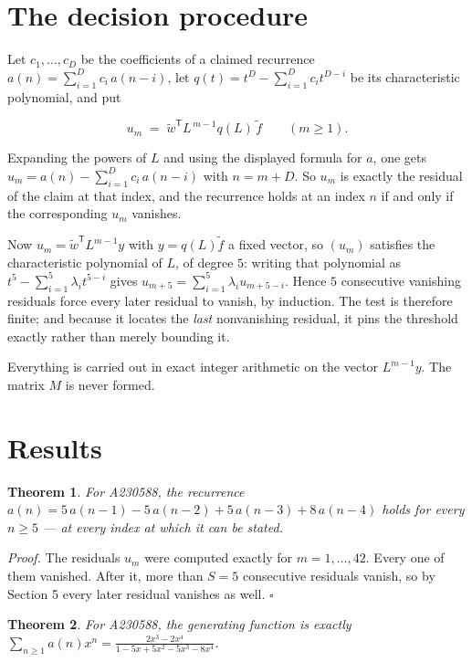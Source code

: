 \documentclass[11pt]{article}
\newtheorem{theorem}{Theorem}
\theoremstyle{definition}
\begin{document}
\section{The decision procedure}

Let $c_1,\dots,c_D$ be the coefficients of a claimed recurrence $a(n) = \sum_{i=1}^{D} c_i\,a(n-i)$, let $q(t) = t^{D} - \sum_{i=1}^{D} c_i t^{D-i}$ be its characteristic polynomial, and put

\[u_m \;=\; \tilde w^{\mathsf T} L^{\,m-1} q(L)\,\tilde f \qquad (m \ge 1).\]

Expanding the powers of $L$ and using the displayed formula for $a$, one gets $u_m = a(n) - \sum_{i=1}^{D} c_i\,a(n-i)$ with $n = m + D$. So $u_m$ is exactly the residual of the claim at that index, and the recurrence holds at an index $n$ if and only if the corresponding $u_m$ vanishes.

Now $u_m = \tilde w^{\mathsf T} L^{m-1} y$ with $y = q(L)\tilde f$ a fixed vector, so $(u_m)$ satisfies the characteristic polynomial of $L$, of degree $5$: writing that polynomial as $t^{5} - \sum_{i=1}^{5} \lambda_i t^{5-i}$ gives $u_{m+5} = \sum_{i=1}^{5} \lambda_i u_{m+5-i}$. Hence $5$ consecutive vanishing residuals force every later residual to vanish, by induction. The test is therefore finite; and because it locates the {\itshape last} nonvanishing residual, it pins the threshold exactly rather than merely bounding it.

Everything is carried out in exact integer arithmetic on the vector $L^{m-1}y$. The matrix $M$ is never formed.

\section{Results}

\begin{theorem} For A230588, the recurrence $a(n) = 5\,a(n-1) - 5\,a(n-2) + 5\,a(n-3) + 8\,a(n-4)$ holds for every $n \ge 5$ --- at every index at which it can be stated.\end{theorem}

{\itshape Proof.} The residuals $u_m$ were computed exactly for $m = 1,\dots,42$. Every one of them vanished. After it, more than $S = 5$ consecutive residuals vanish, so by Section 5 every later residual vanishes as well. $\square$

\begin{theorem} For A230588, the generating function is exactly $\sum_{n\ge 1} a(n)x^n = \frac{2x^{3} - 2x^{4}}{1 - 5x + 5x^{2} - 5x^{3} - 8x^{4}}$.\end{theorem}
\end{document}
